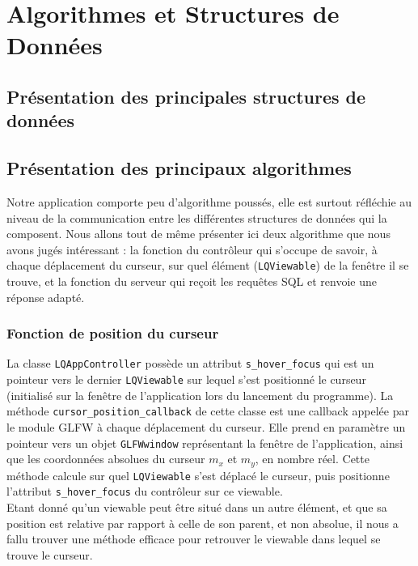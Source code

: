 \documentclass[twoside]{report}
\begin{document}
\chapter{Algorithmes et Structures de Données}
\section{Présentation des principales structures de données}
\label{struct}
\section{Présentation des principaux algorithmes}
Notre application comporte peu d'algorithme poussés, elle est surtout réfléchie au niveau de la communication entre les différentes structures de données qui la composent. Nous allons tout de même présenter ici deux algorithme que nous avons jugés intéressant : la fonction du contrôleur qui s'occupe de savoir, à chaque déplacement du curseur, sur quel élément (\verb!LQViewable!) de la fenêtre il se trouve, et la fonction du serveur qui reçoit les requêtes SQL et renvoie une réponse adapté.
\subsection{Fonction de position du curseur}
La classe \verb!LQAppController! possède un attribut \verb!s_hover_focus! qui est un pointeur vers le dernier \verb!LQViewable! sur lequel s'est positionné le curseur (initialisé sur la fenêtre de l'application lors du lancement du programme).
La méthode \verb!cursor_position_callback! de cette classe est une callback appelée par le module GLFW à chaque déplacement du curseur. Elle prend en paramètre un pointeur vers un objet \verb!GLFWwindow! représentant la fenêtre de l'application, ainsi que les coordonnées absolues du curseur $m_x$ et $m_y$, en nombre réel. Cette méthode calcule sur quel \verb!LQViewable! s'est déplacé le curseur, puis positionne l'attribut \verb!s_hover_focus! du contrôleur sur ce viewable. \\
Etant donné qu'un viewable peut être situé dans un autre élément, et que sa position est relative par rapport à celle de son parent, et non absolue, il nous a fallu trouver une méthode efficace pour retrouver le viewable dans lequel se trouve le curseur. \\
\end{document}
